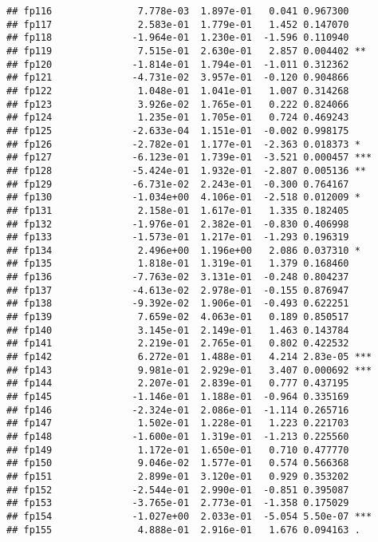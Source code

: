 \documentclass[]{article}
\begin{document}
\begin{verbatim}
## fp116               7.778e-03  1.897e-01   0.041 0.967300    
## fp117               2.583e-01  1.779e-01   1.452 0.147070    
## fp118              -1.964e-01  1.230e-01  -1.596 0.110940    
## fp119               7.515e-01  2.630e-01   2.857 0.004402 ** 
## fp120              -1.814e-01  1.794e-01  -1.011 0.312362    
## fp121              -4.731e-02  3.957e-01  -0.120 0.904866    
## fp122               1.048e-01  1.041e-01   1.007 0.314268    
## fp123               3.926e-02  1.765e-01   0.222 0.824066    
## fp124               1.235e-01  1.705e-01   0.724 0.469243    
## fp125              -2.633e-04  1.151e-01  -0.002 0.998175    
## fp126              -2.782e-01  1.177e-01  -2.363 0.018373 *  
## fp127              -6.123e-01  1.739e-01  -3.521 0.000457 ***
## fp128              -5.424e-01  1.932e-01  -2.807 0.005136 ** 
## fp129              -6.731e-02  2.243e-01  -0.300 0.764167    
## fp130              -1.034e+00  4.106e-01  -2.518 0.012009 *  
## fp131               2.158e-01  1.617e-01   1.335 0.182405    
## fp132              -1.976e-01  2.382e-01  -0.830 0.406998    
## fp133              -1.573e-01  1.217e-01  -1.293 0.196319    
## fp134               2.496e+00  1.196e+00   2.086 0.037310 *  
## fp135               1.818e-01  1.319e-01   1.379 0.168460    
## fp136              -7.763e-02  3.131e-01  -0.248 0.804237    
## fp137              -4.613e-02  2.978e-01  -0.155 0.876947    
## fp138              -9.392e-02  1.906e-01  -0.493 0.622251    
## fp139               7.659e-02  4.063e-01   0.189 0.850517    
## fp140               3.145e-01  2.149e-01   1.463 0.143784    
## fp141               2.219e-01  2.765e-01   0.802 0.422532    
## fp142               6.272e-01  1.488e-01   4.214 2.83e-05 ***
## fp143               9.981e-01  2.929e-01   3.407 0.000692 ***
## fp144               2.207e-01  2.839e-01   0.777 0.437195    
## fp145              -1.146e-01  1.188e-01  -0.964 0.335169    
## fp146              -2.324e-01  2.086e-01  -1.114 0.265716    
## fp147               1.502e-01  1.228e-01   1.223 0.221703    
## fp148              -1.600e-01  1.319e-01  -1.213 0.225560    
## fp149               1.172e-01  1.650e-01   0.710 0.477770    
## fp150               9.046e-02  1.577e-01   0.574 0.566368    
## fp151               2.899e-01  3.120e-01   0.929 0.353202    
## fp152              -2.544e-01  2.990e-01  -0.851 0.395087    
## fp153              -3.765e-01  2.773e-01  -1.358 0.175029    
## fp154              -1.027e+00  2.033e-01  -5.054 5.50e-07 ***
## fp155               4.888e-01  2.916e-01   1.676 0.094163 .  

\end{verbatim}
\end{document}
